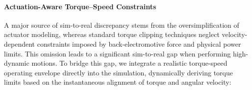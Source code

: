 

\paragraph{Actuation-Aware Torque--Speed Constraints}
A major source of sim-to-real discrepancy stems from the oversimplification of actuator modeling, whereas standard torque clipping techniques neglect velocity-dependent constraints imposed by back-electromotive force and physical power limits. This omission leads to a significant sim-to-real gap when performing high-dynamic motions. To bridge this gap, we integrate a realistic torque-speed operating envelope directly into the simulation, dynamically deriving torque limits based on the instantaneous alignment of torque and angular velocity:


